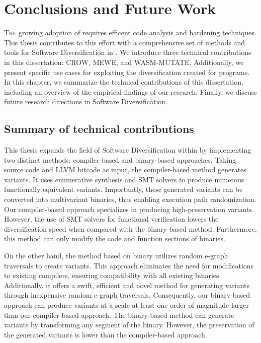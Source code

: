 
\chapter{Conclusions and Future Work}
\label{results}


\lettrine[lines=3]{T}{he} growing adoption of \Wasm requires efficent code analysis and hardening techniques.
This thesis contributes to this effort with a comprehensive set of methods and tools for Software Diversification in \Wasm.
We introduce three technical contributions in this dissertation: CROW, MEWE, and WASM-MUTATE.
Additionally, we present specific use cases for exploiting the diversification created for \Wasm programs.
In this chapter, we summarize the technical contributions of this dissertation, including an overview of the empirical findings of our research.
Finally, we discuss future research directions in \Wasm Software Diversification.

\section{Summary of technical contributions}


This thesis expands the field of Software Diversification within \Wasm by implementing two distinct methods: compiler-based and binary-based approaches. 
Taking source code and LLVM bitcode as input, the compiler-based method generates \Wasm variants.
It uses enumerative synthesis and SMT solvers to produce numerous functionally equivalent variants. 
Importantly, these generated variants can be converted into multivariant binaries, thus enabling execution path randomization. 
Our compiler-based approach specializes in producing high-preservation variants.
However, the use of SMT solvers for functional verification lowers the diversification speed when compared with the binary-based method. 
Furthermore, this method can only modify the code and function sections of \Wasm binaries.

On the other hand, the method based on binary utilizes random e-graph traversals to create variants. 
This approach eliminates the need for modifications to existing compilers, ensuring compatibility with all existing \Wasm binaries. 
Additionally, it offers a swift, efficient and novel method for generating variants through inexpensive random e-graph traversals. 
Consequently, our binary-based approach can produce variants at a scale at least one order of magnitude larger than our compiler-based approach. 
The binary-based method can generate variants by transforming any segment of the \wasm binary.
However, the preservation of the generated variants is lower than the compiler-based approach.

